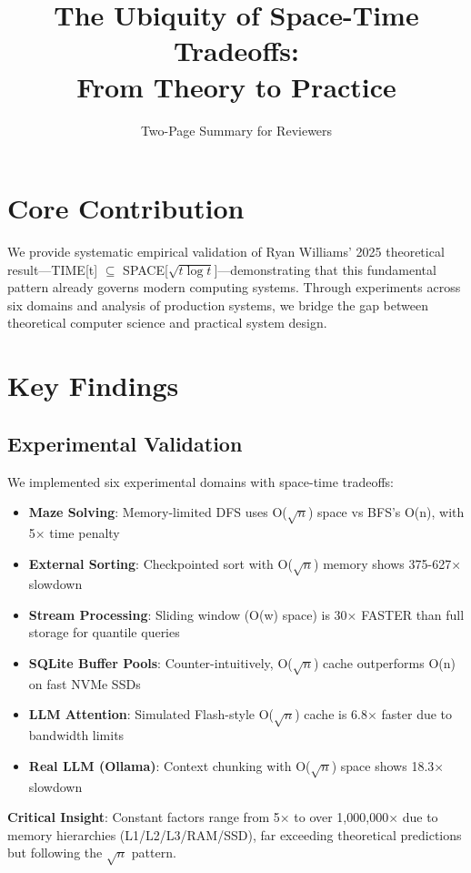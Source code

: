 \documentclass[11pt,twocolumn]{article}
\title{\vspace{-15mm}\textbf{The Ubiquity of Space-Time Tradeoffs:\\From Theory to Practice}\vspace{-5mm}}
\author{Two-Page Summary for Reviewers}
\date{}
\begin{document}
\maketitle
\vspace{-10mm}

\section{Core Contribution}
We provide systematic empirical validation of Ryan Williams' 2025 theoretical result---TIME[t] $\subseteq$ SPACE[$\sqrt{t \log t}$]---demonstrating that this fundamental pattern already governs modern computing systems. Through experiments across six domains and analysis of production systems, we bridge the gap between theoretical computer science and practical system design.

\section{Key Findings}

\subsection{Experimental Validation}
We implemented six experimental domains with space-time tradeoffs:

\begin{itemize}
\item \textbf{Maze Solving}: Memory-limited DFS uses O($\sqrt{n}$) space vs BFS's O(n), with 5$\times$ time penalty
\item \textbf{External Sorting}: Checkpointed sort with O($\sqrt{n}$) memory shows 375-627$\times$ slowdown  
\item \textbf{Stream Processing}: Sliding window (O(w) space) is 30$\times$ FASTER than full storage for quantile queries
\item \textbf{SQLite Buffer Pools}: Counter-intuitively, O($\sqrt{n}$) cache outperforms O(n) on fast NVMe SSDs
\item \textbf{LLM Attention}: Simulated Flash-style O($\sqrt{n}$) cache is 6.8$\times$ faster due to bandwidth limits
\item \textbf{Real LLM (Ollama)}: Context chunking with O($\sqrt{n}$) space shows 18.3$\times$ slowdown
\end{itemize}

\textbf{Critical Insight}: Constant factors range from 5$\times$ to over 1,000,000$\times$ due to memory hierarchies (L1/L2/L3/RAM/SSD), far exceeding theoretical predictions but following the $\sqrt{n}$ pattern.
\end{document}
